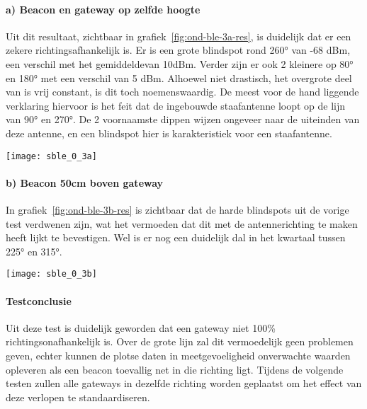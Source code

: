 \paragraph{a) Beacon en gateway op zelfde hoogte}
\begin{minipage}{0.55\textwidth}
Uit dit resultaat, zichtbaar in grafiek~\ref{fig:ond-ble-3a-res}, is duidelijk dat er een zekere richtingsafhankelijk is. Er is een grote blindspot rond 260° van -68 dBm, een verschil met het gemiddelde\footnotemark van 10dBm. Verder zijn er ook 2 kleinere op 80° en 180° met een verschil van 5 dBm. Alhoewel niet drastisch, het overgrote deel van is vrij constant, is dit toch noemenswaardig. De meest voor de hand liggende verklaring hiervoor is het feit dat de ingebouwde staafantenne loopt op de lijn van 90° en 270°. De 2 voornaamste dippen wijzen ongeveer naar de uiteinden van deze antenne, en een blindspot hier is karakteristiek voor een staafantenne.
\end{minipage}
\hfill
\begin{minipage}{0.42\textwidth}
	\texttt{[image: sble\_0\_3a]}
	\label{fig:ond-ble-3a-res}
\end{minipage}


\paragraph{b) Beacon 50cm boven gateway}
\begin{minipage}{0.55\textwidth}
In grafiek~\ref{fig:ond-ble-3b-res} is zichtbaar dat de harde blindspots uit de vorige test verdwenen zijn, wat het vermoeden dat dit met de antennerichting te maken heeft lijkt te bevestigen. Wel is er nog een duidelijk dal in het kwartaal tussen 225° en 315°.
\end{minipage}
\hfill
\begin{minipage}{0.42\textwidth}
	\texttt{[image: sble\_0\_3b]}
	\label{fig:ond-ble-3b-res}
\end{minipage}

\paragraph{Testconclusie}
Uit deze test is duidelijk geworden dat een gateway niet 100\% richtingsonafhankelijk is. Over de grote lijn zal dit vermoedelijk geen problemen geven, echter kunnen de plotse daten in meetgevoeligheid onverwachte waarden opleveren als een beacon toevallig net in die richting ligt.
Tijdens de volgende testen zullen alle gateways in dezelfde richting worden geplaatst om het effect van deze verlopen te standaardiseren. 

